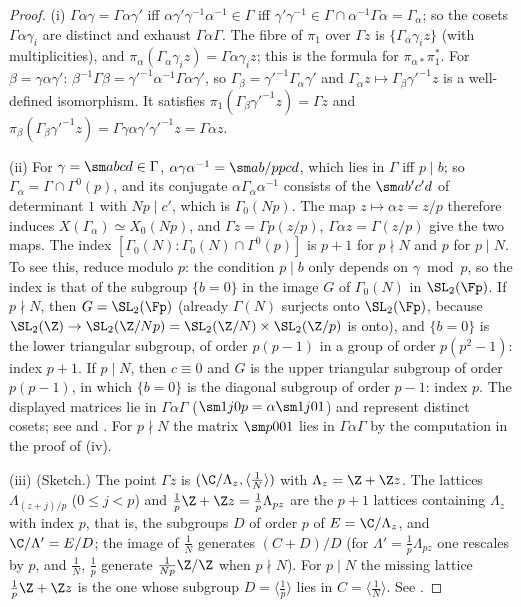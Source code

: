 \begin{proof}
(i) $\Gamma\alpha\gamma=\Gamma\alpha\gamma'$ iff $\alpha\gamma'\gamma^{-1}\alpha^{-1}\in\Gamma$ iff $\gamma'\gamma^{-1}\in\Gamma\cap\alpha^{-1}\Gamma\alpha=\Gamma_\alpha$; so the cosets $\Gamma\alpha\gamma_i$ are distinct and exhaust $\Gamma\alpha\Gamma$. The fibre
of $\pi_1$ over $\Gamma z$ is $\{\Gamma_\alpha\gamma_iz\}$ (with multiplicities), and $\pi_\alpha(\Gamma_\alpha\gamma_iz)=\Gamma\alpha\gamma_iz$; this is the formula for $\pi_{\alpha*}\pi_1^*$. For $\beta=\gamma\alpha\gamma'$:
$\beta^{-1}\Gamma\beta=\gamma'^{-1}\alpha^{-1}\Gamma\alpha\gamma'$, so $\Gamma_\beta=\gamma'^{-1}\Gamma_\alpha\gamma'$ and $\Gamma_\alpha z\mapsto\Gamma_\beta\gamma'^{-1}z$ is a well-defined isomorphism. It satisfies
$\pi_1(\Gamma_\beta\gamma'^{-1}z)=\Gamma z$ and $\pi_\beta(\Gamma_\beta\gamma'^{-1}z)=\Gamma\gamma\alpha\gamma'\gamma'^{-1}z=\Gamma\alpha z$.

(ii) For $\gamma=\sm abcd\in\Gamma$, $\alpha\gamma\alpha^{-1}=\sm a{b/p}{pc}d$, which lies in $\Gamma$ iff $p\mid b$; so $\Gamma_\alpha=\Gamma\cap\Gamma^0(p)$, and its conjugate
$\alpha\Gamma_\alpha\alpha^{-1}$ consists of the $\sm a{b'}{c'}d$ of determinant $1$ with $Np\mid c'$, which is $\Gamma_0(Np)$. The map $z\mapsto\alpha z=z/p$ therefore induces
$X(\Gamma_\alpha)\simeq X_0(Np)$, and $\Gamma z=\Gamma p(z/p)$, $\Gamma\alpha z=\Gamma(z/p)$ give the two maps. The index $[\Gamma_0(N):\Gamma_0(N)\cap\Gamma^0(p)]$ is $p+1$ for $p\nmid N$ and
$p$ for $p\mid N$. To see this, reduce modulo $p$: the condition $p\mid b$ only depends on $\gamma\bmod p$, so the index is that of the subgroup $\{b=0\}$ in the image $G$ of $\Gamma_0(N)$ in
$\SL_2(\Fp)$. If $p\nmid N$, then $G=\SL_2(\Fp)$ (already $\Gamma(N)$ surjects onto $\SL_2(\Fp)$, because $\SL_2(\Z)\to\SL_2(\Z/Np)=\SL_2(\Z/N)\times\SL_2(\Z/p)$ is onto), and $\{b=0\}$ is
the lower triangular subgroup, of order $p(p-1)$ in a group of order $p(p^2-1)$: index $p+1$. If $p\mid N$, then $c\equiv0$ and $G$ is the upper triangular subgroup of order $p(p-1)$, in which
$\{b=0\}$ is the diagonal subgroup of order $p-1$: index $p$. The displayed matrices lie in $\Gamma\alpha\Gamma$ ($\sm1j0p=\alpha\sm1j01$) and represent distinct cosets; see  and \cite[Section 5.2]{DiamondShurman}. For
$p\nmid N$ the matrix $\sm p001$ lies in $\Gamma\alpha\Gamma$ by the computation in the proof of (iv).

(iii) (Sketch.) The point $\Gamma z$ is $(\C/\Lambda_z,\langle\frac1N\rangle)$ with $\Lambda_z=\Z+\Z z$. The lattices $\Lambda_{(z+j)/p}$ ($0\le j<p$) and $\frac1p\Z+\Z z=\frac1p\Lambda_{pz}$ are the $p+1$
lattices containing $\Lambda_z$ with index $p$, that is, the subgroups $D$ of order $p$ of $E=\C/\Lambda_z$, and $\C/\Lambda'=E/D$; the image of $\frac1N$ generates $(C+D)/D$
(for $\Lambda'=\frac1p\Lambda_{pz}$ one rescales by $p$, and $\frac1N$, $\frac1p$ generate $\frac1{Np}\Z/\Z$ when $p\nmid N$). For $p\mid N$ the missing lattice $\frac1p\Z+\Z z$ is the one
whose subgroup $D=\langle\frac1p\rangle$ lies in $C=\langle\frac1N\rangle$. See \cite[Sections 5.2, 7.9]{DiamondShurman}.


\end{proof}
